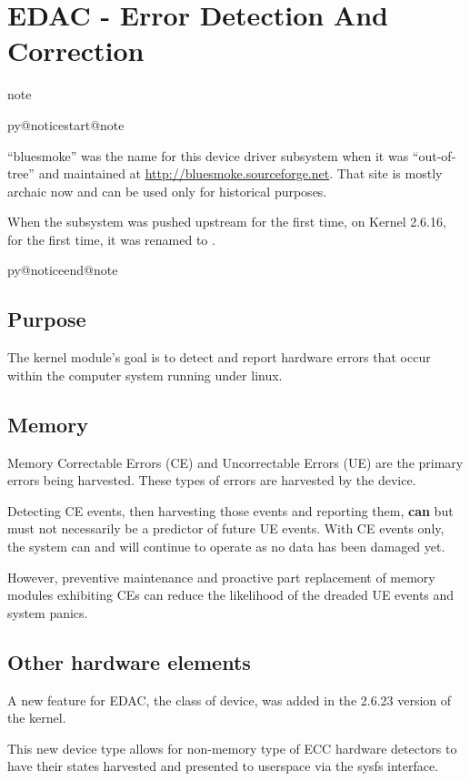 \documentclass[a4paper,8pt,english]{sphinxmanual}
\makeatletter
\renewenvironment{notice}[2]{%
          \def\py@noticetype{#1}
          \begin{coloredbox}{#1}
          \bf\it
          \par\strong{#2}
          \csname py@noticestart@#1\endcsname
        }
	{
          \csname py@noticeend@\py@noticetype\endcsname
          \end{coloredbox}
        }
\makeatother
\begin{document}
\section{EDAC - Error Detection And Correction}
\label{admin-guide/ras:edac-error-detection-and-correction}
\begin{notice}{note}{Note:}
``bluesmoke'' was the name for this device driver subsystem when it
was ``out-of-tree'' and maintained at \href{http://bluesmoke.sourceforge.net}{http://bluesmoke.sourceforge.net}.
That site is mostly archaic now and can be used only for historical
purposes.

When the subsystem was pushed upstream for the first time, on
Kernel 2.6.16, for the first time, it was renamed to .
\end{notice}


\subsection{Purpose}
\label{admin-guide/ras:purpose}
The  kernel module's goal is to detect and report hardware errors
that occur within the computer system running under linux.


\subsection{Memory}
\label{admin-guide/ras:memory}
Memory Correctable Errors (CE) and Uncorrectable Errors (UE) are the
primary errors being harvested. These types of errors are harvested by
the  device.

Detecting CE events, then harvesting those events and reporting them,
\textbf{can} but must not necessarily be a predictor of future UE events. With
CE events only, the system can and will continue to operate as no data
has been damaged yet.

However, preventive maintenance and proactive part replacement of memory
modules exhibiting CEs can reduce the likelihood of the dreaded UE events
and system panics.


\subsection{Other hardware elements}
\label{admin-guide/ras:other-hardware-elements}
A new feature for EDAC, the  class of device, was added in
the 2.6.23 version of the kernel.

This new device type allows for non-memory type of ECC hardware detectors
to have their states harvested and presented to userspace via the sysfs
interface.
\end{document}
